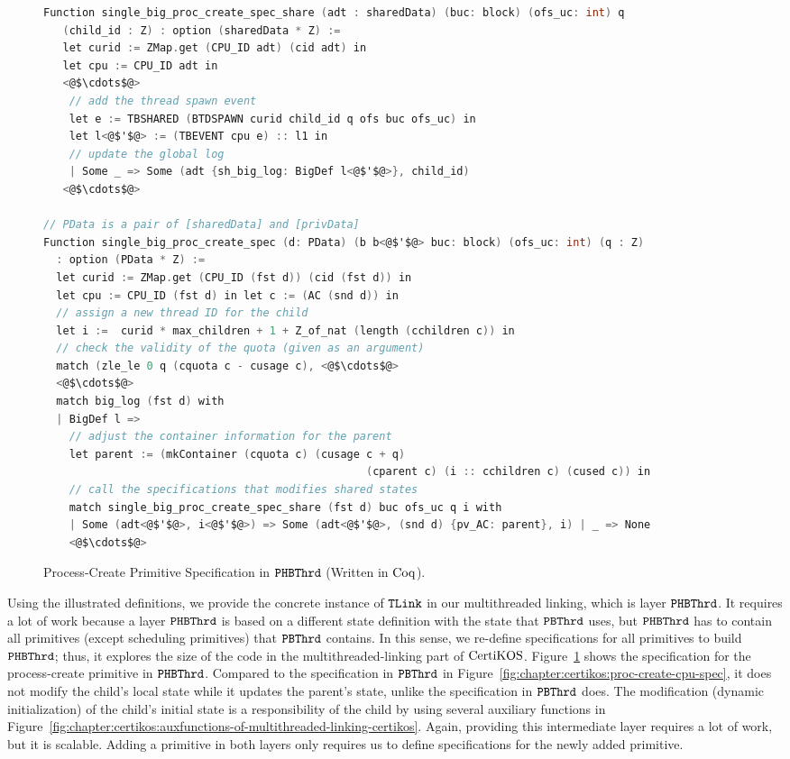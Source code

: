 \begin{figure}
\begin{lstlisting}[language=C, deletekeywords={int}]
Function single_big_proc_create_spec_share (adt : sharedData) (buc: block) (ofs_uc: int) q
   (child_id : Z) : option (sharedData * Z) :=
   let curid := ZMap.get (CPU_ID adt) (cid adt) in
   let cpu := CPU_ID adt in
   <@$\cdots$@>
    // add the thread spawn event
    let e := TBSHARED (BTDSPAWN curid child_id q ofs buc ofs_uc) in
    let l<@$'$@> := (TBEVENT cpu e) :: l1 in
    // update the global log
    | Some _ => Some (adt {sh_big_log: BigDef l<@$'$@>}, child_id)
   <@$\cdots$@>
      
// PData is a pair of [sharedData] and [privData]
Function single_big_proc_create_spec (d: PData) (b b<@$'$@> buc: block) (ofs_uc: int) (q : Z) 
  : option (PData * Z) :=
  let curid := ZMap.get (CPU_ID (fst d)) (cid (fst d)) in
  let cpu := CPU_ID (fst d) in let c := (AC (snd d)) in
  // assign a new thread ID for the child
  let i :=  curid * max_children + 1 + Z_of_nat (length (cchildren c)) in
  // check the validity of the quota (given as an argument)
  match (zle_le 0 q (cquota c - cusage c), <@$\cdots$@>
  <@$\cdots$@>
  match big_log (fst d) with
  | BigDef l =>
    // adjust the container information for the parent
    let parent := (mkContainer (cquota c) (cusage c + q)
                                                  (cparent c) (i :: cchildren c) (cused c)) in
    // call the specifications that modifies shared states 
    match single_big_proc_create_spec_share (fst d) buc ofs_uc q i with
    | Some (adt<@$'$@>, i<@$'$@>) => Some (adt<@$'$@>, (snd d) {pv_AC: parent}, i) | _ => None
    <@$\cdots$@>       
\end{lstlisting}
\caption{Process-Create Primitive Specification in ${{\mathrm{\texttt{PHBThrd}}}}$ (Written in $\mathrm{Coq}$).}
\label{fig:chapter:certikos:proc-create-cpu-spec-phbthred}
\end{figure}

Using the illustrated definitions, we provide the concrete instance of ${{\mathrm{\texttt{TLink}}}}$ in our multithreaded linking,
which is layer ${{\mathrm{\texttt{PHBThrd}}}}$. 
It requires a lot of work because a layer  
${{\mathrm{\texttt{PHBThrd}}}}$  is based on a different state definition with the state that 
${{\mathrm{\texttt{PBThrd}}}}$ uses,
but ${{\mathrm{\texttt{PHBThrd}}}}$ has to contain all primitives (except scheduling primitives)
that ${{\mathrm{\texttt{PBThrd}}}}$ contains.
In this sense, 
we re-define specifications for all primitives to build ${{\mathrm{\texttt{PHBThrd}}}}$; thus, it explores the size of the code in the multithreaded-linking part of $\mathrm{CertiKOS}$.
Figure~\ref{fig:chapter:certikos:proc-create-cpu-spec-phbthred} shows the specification for the process-create primitive in ${{\mathrm{\texttt{PHBThrd}}}}$.
Compared to the specification in ${{\mathrm{\texttt{PBThrd}}}}$ in Figure~\ref{fig:chapter:certikos:proc-create-cpu-spec},
 it does not modify the child's local state while it updates the 
 parent's state, unlike the specification in ${{\mathrm{\texttt{PBThrd}}}}$ does.
The modification (dynamic initialization) of the child's initial state is a responsibility of the child by using several auxiliary functions in Figure~\ref{fig:chapter:certikos:auxfunctions-of-multithreaded-linking-certikos}.
Again, providing this intermediate layer  requires a lot of work, but it is scalable.
Adding a primitive in both layers only requires us to define  specifications for the newly added primitive.


